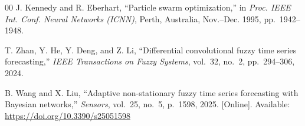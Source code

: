 \documentclass[conference]{IEEEtran}
\begin{document}
\begin{thebibliography}{00}
J. Kennedy and R. Eberhart,
``Particle swarm optimization,''
in \textit{Proc. IEEE Int. Conf. Neural Networks (ICNN)},
Perth, Australia, Nov.--Dec. 1995, pp.~1942--1948.

T. Zhan, Y. He, Y. Deng, and Z. Li,
``Differential convolutional fuzzy time series forecasting,''
\textit{IEEE Transactions on Fuzzy Systems}, vol.~32, no.~2,
pp.~294--306, 2024.

B. Wang and X. Liu,
``Adaptive non-stationary fuzzy time series forecasting with
Bayesian networks,''
\textit{Sensors}, vol.~25, no.~5, p.~1598, 2025.
[Online]. Available: \url{https://doi.org/10.3390/s25051598}

\end{thebibliography}
\end{document}
